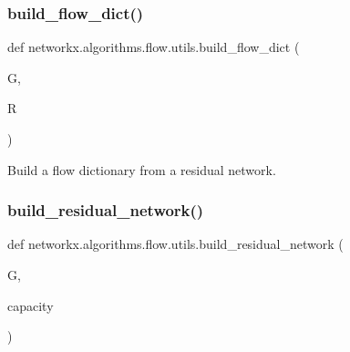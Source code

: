 \subsubsection{\texorpdfstring{build\+\_\+flow\+\_\+dict()}{build\_flow\_dict()}}
{\footnotesize\ttfamily def networkx.\+algorithms.\+flow.\+utils.\+build\+\_\+flow\+\_\+dict (\begin{DoxyParamCaption}\item[{}]{G,  }\item[{}]{R }\end{DoxyParamCaption})}

\begin{DoxyVerb}Build a flow dictionary from a residual network.\end{DoxyVerb}
 \mbox{\label{namespacenetworkx_1_1algorithms_1_1flow_1_1utils_a515b34ec3e49e135f52a56a114eb6325}} 
\subsubsection{\texorpdfstring{build\+\_\+residual\+\_\+network()}{build\_residual\_network()}}
{\footnotesize\ttfamily def networkx.\+algorithms.\+flow.\+utils.\+build\+\_\+residual\+\_\+network (\begin{DoxyParamCaption}\item[{}]{G,  }\item[{}]{capacity }\end{DoxyParamCaption})}

